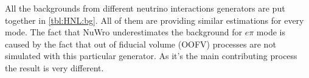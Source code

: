 \documentclass[../main.tex]{subfiles}
\begin{document}
\begin{comment}
\begin{table}[!ht]
\begin{tabular}{|c|l|r|r|r|r|r|r|r|r|r|r|r|}
  \hline
  N & Cut           &  CCQE   &  RES  &  DIS  &  COH  &  NC  &  2P2H  &  OOFV  &$\bar{\nu_{\mu}}$& $\nu_{e}$ & Total  & Eff\\
  \hline
  1 & Vertex        & 140.11  & 30.88 & 20.34 & 4.57  & 8.48 & 1.65   & 647.31 & 2.39            &  3.63     & 859.34 & 42.1 \\
  \hline
  2 & Veto          & 136.47  & 27.86 & 17.58 & 4.25  & 8.15 & 1.65   & 514.72 & 2.10            &  3.45     & 716.23 & 42.0 \\
  \hline
  3 & Use TPC       & 135.77  & 27.31 & 17.19 & 4.25  & 8.15 & 1.48   & 505.18 & 2.10            &  3.45     & 704.88 & 40.5 \\
  \hline
  4 & TPC act.      & 122.44  & 21.24 & 10.75 & 3.89  & 6.55 & 0.82   & 281.47 & 1.80            &  2.43     & 451.39 & 38.2 \\
  \hline
  5 & PID 1         & 121.90  & 17.97 & 9.27  & 3.54  & 4.19 & 0.82   & 134.29 & 1.36            &  0.54     & 284.87 & 33.6 \\
  \hline
  6 & PID 2         & 4.38    & 5.01  & 5.22  & 1.70  & 0.91 & 0.00   & 27.59  & 1.08            &  0.91     &  46.09 & 22.5 \\
  \hline
  7 & Use ECal      & 2.12    & 1.79  & 1.89  & 0.68  & 0.34 & 0.00   & 2.56   & 0.33            &  0.00     &  9.72  &  9.9  \\
  \hline
  8 & ECal MIP      & 1.09    & 0.55  & 1.31  & 0.51  & 0.00 & 0.00   & 1.08   & 0.16            &  0.00     &  4.71  &  9.3  \\
  \hline
  9 & $\theta$ cut  & 0.93    & 0.36  & 0.39  & 0.51  & 0.00 & 0.00   & 0.00   & 0.00            &  0.00     & 2.18   &  9.1 \\
  \hline

\end{tabular}
\caption{The number of MC background events after every cut for $10^{21} POT$ from NEUT for $\mu\mu\nu$ mode.}
\label{tbl:HNL:bgOrigDiMuon}
\end{table}
\end{comment}

All the backgrounds from different neutrino interactions generators are put together in \autoref{tbl:HNL:bg}. All of them are providing similar estimations for every mode. The fact that NuWro underestimates the background for $e\pi$ mode is caused by the fact that out of fiducial volume (OOFV) processes are not simulated with this particular generator. As it's the main contributing process the result is very different.
\end{document}
